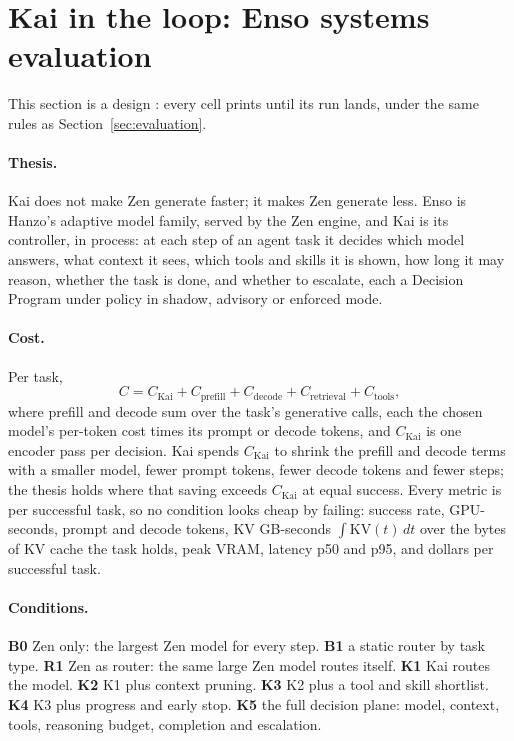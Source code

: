 \section{Kai in the loop: Enso systems evaluation}
\label{sec:enso}

This section is a design \proposed: every cell prints \ph{} until its run
lands, under the same rules as Section~\ref{sec:evaluation}.

\paragraph{Thesis.}
Kai does not make Zen generate faster; it makes Zen generate less. Enso is
Hanzo's adaptive model family, served by the Zen engine, and Kai is its
controller, in process: at each step of an agent task it decides which model
answers, what context it sees, which tools and skills it is shown, how long it
may reason, whether the task is done, and whether to escalate, each a Decision
Program under policy in shadow, advisory or enforced mode.

\paragraph{Cost.}
Per task,
\begin{equation}
  C = C_{\mathrm{Kai}} + C_{\mathrm{prefill}} + C_{\mathrm{decode}}
      + C_{\mathrm{retrieval}} + C_{\mathrm{tools}},
  \label{eq:cost}
\end{equation}
where prefill and decode sum over the task's generative calls, each the chosen
model's per-token cost times its prompt or decode tokens, and $C_{\mathrm{Kai}}$
is one encoder pass per decision. Kai spends $C_{\mathrm{Kai}}$ to shrink the
prefill and decode terms with a smaller model, fewer prompt tokens, fewer decode
tokens and fewer steps; the thesis holds where that saving exceeds
$C_{\mathrm{Kai}}$ at equal success. Every metric is per successful task, so no
condition looks cheap by failing: success rate, GPU-seconds, prompt and decode
tokens, KV GB-seconds $\int \mathrm{KV}(t)\,dt$ over the bytes of KV cache the
task holds, peak VRAM, latency p50 and p95, and dollars per successful task.

\paragraph{Conditions.}
\textbf{B0} Zen only: the largest Zen model for every step. \textbf{B1} a
static router by task type. \textbf{R1} Zen as router: the same large Zen model
routes itself. \textbf{K1} Kai routes the model. \textbf{K2} K1 plus context
pruning. \textbf{K3} K2 plus a tool and skill shortlist. \textbf{K4} K3 plus
progress and early stop. \textbf{K5} the full decision plane: model, context,
tools, reasoning budget, completion and escalation.

